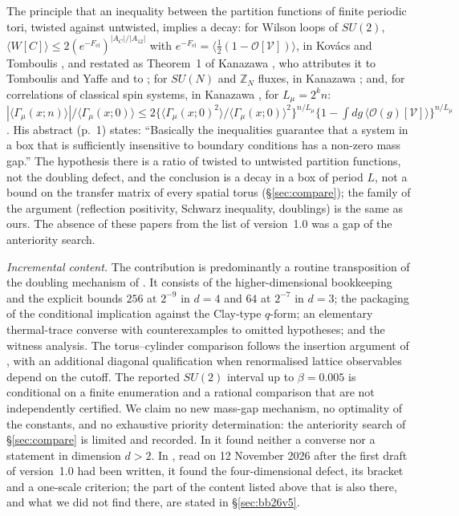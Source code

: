 \documentclass[11pt,a4paper]{article}
\theoremstyle{plain}
\theoremstyle{definition}
\theoremstyle{remark}
\numberwithin{equation}{section}
\begin{document}
The principle that an inequality between the partition functions of finite periodic tori, twisted against untwisted, implies a decay: for Wilson loops of $SU(2)$, $\langle W[C]\rangle\le2(e^{-F_{\mathrm{el}}})^{|A_C|/|A_{12}|}$ with $e^{-F_{\mathrm{el}}}=\langle\frac12(1-\mathcal O[\mathcal V])\rangle$, in Kov\'acs and Tomboulis \cite[eqs.~(6) and~(11), pp.~4--5]{KT02}, and restated as Theorem~1 of Kanazawa \cite[p.~5]{Kan}, who attributes it to Tomboulis and Yaffe \cite{TY85} and to \cite{KT02}; for $SU(N)$ and $\mathbb Z_N$ fluxes, in Kanazawa \cite[Theorem~2, p.~7]{Kan}; and, for correlations of classical spin systems, in Kanazawa \cite[Theorem~5, p.~17]{Kan}, for $L_\mu=2^kn$: $|\langle\Gamma_\mu(x;n)\rangle|/\langle\Gamma_\mu(x;0)\rangle\le2\{\langle\Gamma_\mu(x;0)^2\rangle/\langle\Gamma_\mu(x;0)\rangle^2\}^{n/L_\mu}\{1-\int dg\,\langle\mathcal O(g)[\mathcal V]\rangle\}^{n/L_\mu}$. His abstract (p.~1) states: ``Basically the inequalities guarantee that a system in a box that is sufficiently insensitive to boundary conditions has a non-zero mass gap.'' The hypothesis there is a ratio of twisted to untwisted partition functions, not the doubling defect, and the conclusion is a decay in a box of period $L$, not a bound on the transfer matrix of every spatial torus (\S\ref{sec:compare}); the family of the argument (reflection positivity, Schwarz inequality, doublings) is the same as ours. The absence of these papers from the list of version~1.0 was a gap of the anteriority search.

\emph{Incremental content.} The contribution is predominantly a routine transposition of the doubling mechanism of \cite{OAI26}.
It consists of the higher-dimensional bookkeeping and the explicit bounds $256$ at $2^{-9}$ in $d=4$ and $64$ at $2^{-7}$ in $d=3$; the
packaging of the conditional implication against the Clay-type $q$-form; an elementary thermal-trace converse with counterexamples to omitted
hypotheses; and the witness analysis. The torus--cylinder comparison follows the insertion argument of \cite{OAI26}, with an additional
diagonal qualification when renormalised lattice observables depend on the cutoff. The reported $SU(2)$ interval up to $\beta=0.005$ is conditional on a
finite enumeration and a rational comparison that are not independently certified. We claim no new mass-gap mechanism, no optimality of the constants, and no
exhaustive priority determination: the anteriority search of \S\ref{sec:compare} is limited and recorded. In \cite{OAI26} it found neither
a converse nor a statement in dimension $d>2$. In \cite{BB26v5}, read on 12 November 2026 after the first draft of version~1.0 had been written, it found the
four-dimensional defect, its bracket and a one-scale criterion; the part of the content listed above that is also there, and what we did
not find there, are stated in \S\ref{sec:bb26v5}.
\end{document}
